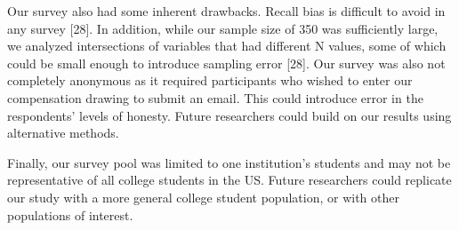 Our survey also had some inherent drawbacks. Recall bias is difficult to avoid
in any survey [28]. In addition, while our sample size of 350 was sufficiently
large, we analyzed intersections of variables that had different N values,
some of which could be small enough to introduce sampling error [28]. Our
survey was also not completely anonymous as it required participants who
wished to enter our compensation drawing to submit an email. This could
introduce error in the respondents' levels of honesty. Future researchers
could build on our results using alternative methods.

Finally, our survey pool was limited to one institution's students and may not be representative of all college students in the US. Future researchers could replicate our study
with a more general college student population, or with other populations of
interest.
